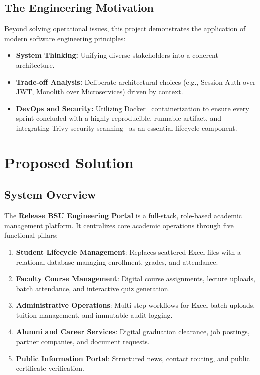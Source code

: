 \subsection{The Engineering Motivation}

Beyond solving operational issues, this project demonstrates the application of modern software engineering principles:
\begin{itemize}
    \item \textbf{System Thinking:} Unifying diverse stakeholders into a coherent architecture.
    \item \textbf{Trade-off Analysis:} Deliberate architectural choices (e.g., Session Auth over JWT, Monolith over Microservices) driven by context.
    \item \textbf{DevOps and Security:} Utilizing Docker~\cite{docker} containerization to ensure every sprint concluded with a highly reproducible, runnable artifact, and integrating Trivy security scanning~\cite{trivy} as an essential lifecycle component.
\end{itemize}

\section{Proposed Solution}
\label{sec:proposed-solution}

\subsection{System Overview}

The \textbf{Release BSU Engineering Portal} is a full-stack, role-based academic management platform. It centralizes core academic operations through five functional pillars:
\begin{enumerate}
    \item \textbf{Student Lifecycle Management}: Replaces scattered Excel files with a relational database managing enrollment, grades, and attendance.
    \item \textbf{Faculty Course Management}: Digital course assignments, lecture uploads, batch attendance, and interactive quiz generation.
    \item \textbf{Administrative Operations}: Multi-step workflows for Excel batch uploads, tuition management, and immutable audit logging.
    \item \textbf{Alumni and Career Services}: Digital graduation clearance, job postings, partner companies, and document requests.
    \item \textbf{Public Information Portal}: Structured news, contact routing, and public certificate verification.
\end{enumerate}

